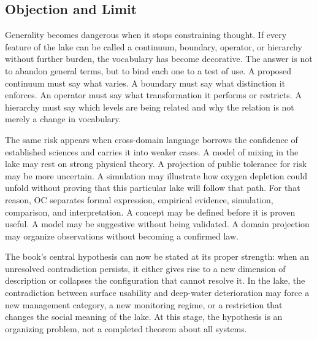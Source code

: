 \documentclass[11pt,a4paper,openany]{book}
\begin{document}
\subsection{Objection and Limit}
Generality becomes dangerous when it stops constraining thought. If every feature of the lake can be called a continuum, boundary, operator, or hierarchy without further burden, the vocabulary has become decorative. The answer is not to abandon general terms, but to bind each one to a test of use. A proposed continuum must say what varies. A boundary must say what distinction it enforces. An operator must say what transformation it performs or restricts. A hierarchy must say which levels are being related and why the relation is not merely a change in vocabulary. \cite{wilson_renormalization,landau_stat_physics}\par
The same risk appears when cross-domain language borrows the confidence of established sciences and carries it into weaker cases. A model of mixing in the lake may rest on strong physical theory. A projection of public tolerance for risk may be more uncertain. A simulation may illustrate how oxygen depletion could unfold without proving that this particular lake will follow that path. For that reason, OC separates formal expression, empirical evidence, simulation, comparison, and interpretation. A concept may be defined before it is proven useful. A model may be suggestive without being validated. A domain projection may organize observations without becoming a confirmed law.\par
The book's central hypothesis can now be stated at its proper strength: when an unresolved contradiction persists, it either gives rise to a new dimension of description or collapses the configuration that cannot resolve it. In the lake, the contradiction between surface usability and deep-water deterioration may force a new management category, a new monitoring regime, or a restriction that changes the social meaning of the lake. At this stage, the hypothesis is an organizing problem, not a completed theorem about all systems.\par
\end{document}
